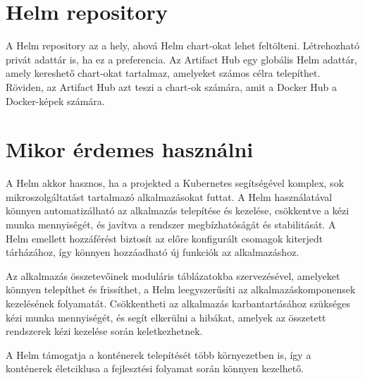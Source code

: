 \section{Helm repository}
A Helm repository az a hely, ahová Helm chart-okat lehet feltölteni. Létrehozható privát adattár is, ha ez a preferencia. Az Artifact Hub egy globális Helm adattár, amely kereshető chart-okat tartalmaz, amelyeket számos célra telepíthet. Röviden, az Artifact Hub azt teszi a chart-ok számára, amit a Docker Hub a Docker-képek számára.
\cite{helm}

\section{Mikor érdemes használni}
A Helm akkor hasznos, ha a projekted a Kubernetes segítségével komplex, sok mikroszolgáltatást tartalmazó alkalmazásokat futtat. A Helm használatával könnyen automatizálható az alkalmazás telepítése és kezelése, csökkentve a kézi munka mennyiségét, és javítva a rendszer megbízhatóságát és stabilitását. A Helm emellett hozzáférést biztosít az előre konfigurált csomagok kiterjedt tárházához, így könnyen hozzáadható új funkciók az alkalmazáshoz.

Az alkalmazás összetevőinek moduláris táblázatokba szervezésével, amelyeket könnyen telepíthet és frissíthet, a Helm leegyszerűsíti az alkalmazáskomponensek kezelésének folyamatát. Csökkentheti az alkalmazás karbantartásához szükséges kézi munka mennyiségét, és segít elkerülni a hibákat, amelyek az összetett rendszerek kézi kezelése során keletkezhetnek.

A Helm támogatja a konténerek telepítését több környezetben is, így a konténerek életciklusa a fejlesztési folyamat során könnyen kezelhető.
\cite{helm}